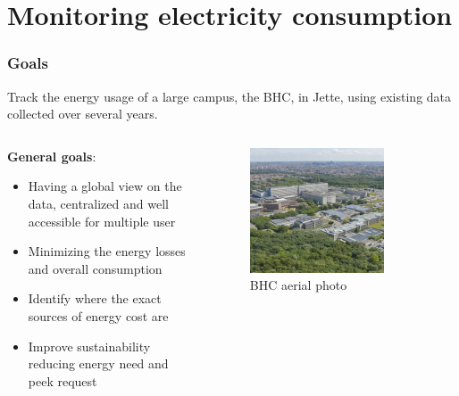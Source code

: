 \section{Monitoring electricity consumption}
\SectionPage

\begin{frame}
    \frametitle{Goals}
    \vspace*{\fill}
    Track the energy usage of a large campus, the \ac{BHC}, in Jette, using existing data collected over several years.

    \begin{columns}[onlytextwidth, c]
        \begin{column}{.47\textwidth}
            \textbf{General goals}:
            \begin{itemize}
                \item Having a global view on the data, centralized and well accessible for multiple user
                \item Minimizing the energy losses and overall consumption
                \item Identify where the exact sources of energy cost are
                \item Improve sustainability reducing energy need and peek request
            \end{itemize}
        \end{column}
        \begin{column}{.52\textwidth}
            \begin{figure}[ht]
                \includegraphics[width=0.78\textwidth]{frames/figures/jette_luchtfoto.jpg}
                \caption{\ac{BHC} aerial photo}
            \end{figure}
        \end{column}
    \end{columns}
    \vspace*{\fill}
\end{frame}

